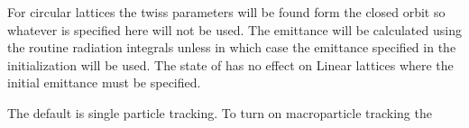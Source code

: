 For circular lattices the twiss parameters will be found form the closed orbit
so whatever is specified here will not be used.
The emittance will be calculated using the \bmad routine
radiation integrals unless  in which case the emittance
specified in the initialization will be used. The state of 
has no effect on Linear lattices where the initial emittance must be specified.

The default is single particle tracking. To turn on macroparticle tracking the
\vn{global%
the \vn{tao_params} namelist above, for example,
\begin{example}
  \&tao_params
    n_v1_var_max  = 5
    n_d2_data_max = 6
    n_data_max    = 2000
    n_var_max     = 2000
    global%
    global%
  /
\end{example}

\section{Initializing Variables}
\label{s:init_var} 

}
